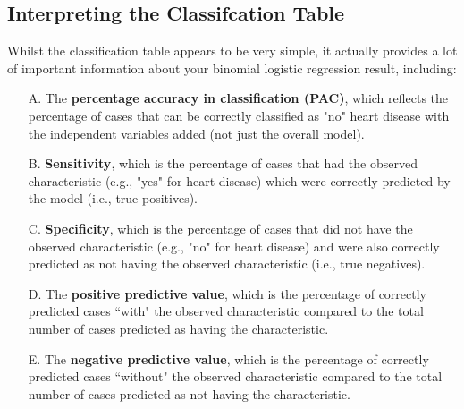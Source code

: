 \documentclass[a4paper,12pt]{article}
\begin{document}
\subsection*{Interpreting the Classifcation Table}
Whilst the classification table appears to be very simple, it actually provides a lot of important information about your binomial logistic regression result, including:


\begin{itemize}
	\item[A.] The \textbf{percentage accuracy in classification (PAC)}, which reflects the percentage of cases that can be correctly classified as "no" heart disease with the independent variables added (not just the overall model).
	\item[B.] \textbf{Sensitivity}, which is the percentage of cases that had the observed characteristic (e.g., "yes" for heart disease) which were correctly predicted by the model (i.e., true positives).
	\item[C.] \textbf{Specificity}, which is the percentage of cases that did not have the observed characteristic (e.g., "no" for heart disease) and were also correctly predicted as not having the observed characteristic (i.e., true negatives).
	\item[D.] The \textbf{positive predictive value}, which is the percentage of correctly predicted cases ``with" the observed characteristic compared to the total number of cases predicted as having the characteristic.
	\item[E.] The \textbf{negative predictive value}, which is the percentage of correctly predicted cases ``without" the observed characteristic compared to the total number of cases predicted as not having the characteristic.
\end{itemize}

\newpage


	
\end{document}
